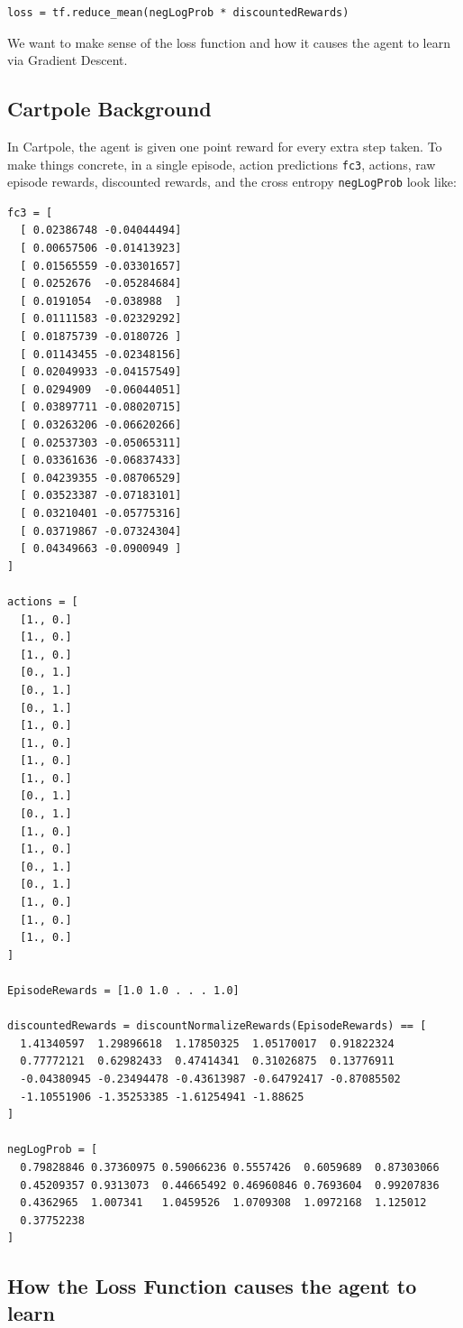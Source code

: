 \documentclass[20pt]{extarticle}
\theoremstyle{plain}
\theoremstyle{definition}
\theoremstyle{remark}
\newcommand{\0}{\varnothing}
\newcommand{\<}{\langle}
\renewcommand{\>}{\rangle}
\begin{document}
\footnotesize
\begin{lstlisting}
loss = tf.reduce_mean(negLogProb * discountedRewards)
\end{lstlisting}
\normalsize

We want to make sense of the loss function and how it causes the agent to learn via Gradient Descent.

\subsection{Cartpole Background}

In Cartpole, the agent is given one point reward for every extra step taken. To make things concrete, in a single episode, action predictions \lstinline{fc3}, actions, raw episode rewards, discounted rewards, and the cross entropy \lstinline{negLogProb} look like:

\scriptsize
\begin{lstlisting}
fc3 = [
  [ 0.02386748 -0.04044494]
  [ 0.00657506 -0.01413923]
  [ 0.01565559 -0.03301657]
  [ 0.0252676  -0.05284684]
  [ 0.0191054  -0.038988  ]
  [ 0.01111583 -0.02329292]
  [ 0.01875739 -0.0180726 ]
  [ 0.01143455 -0.02348156]
  [ 0.02049933 -0.04157549]
  [ 0.0294909  -0.06044051]
  [ 0.03897711 -0.08020715]
  [ 0.03263206 -0.06620266]
  [ 0.02537303 -0.05065311]
  [ 0.03361636 -0.06837433]
  [ 0.04239355 -0.08706529]
  [ 0.03523387 -0.07183101]
  [ 0.03210401 -0.05775316]
  [ 0.03719867 -0.07324304]
  [ 0.04349663 -0.0900949 ]
]

actions = [
  [1., 0.]
  [1., 0.]
  [1., 0.]
  [0., 1.]
  [0., 1.]
  [0., 1.]
  [1., 0.]
  [1., 0.]
  [1., 0.]
  [1., 0.]
  [0., 1.]
  [0., 1.]
  [1., 0.]
  [1., 0.]
  [0., 1.]
  [0., 1.]
  [1., 0.]
  [1., 0.]
  [1., 0.]
]

EpisodeRewards = [1.0 1.0 . . . 1.0]

discountedRewards = discountNormalizeRewards(EpisodeRewards) == [
  1.41340597  1.29896618  1.17850325  1.05170017  0.91822324
  0.77772121  0.62982433  0.47414341  0.31026875  0.13776911
  -0.04380945 -0.23494478 -0.43613987 -0.64792417 -0.87085502
  -1.10551906 -1.35253385 -1.61254941 -1.88625
]

negLogProb = [
  0.79828846 0.37360975 0.59066236 0.5557426  0.6059689  0.87303066
  0.45209357 0.9313073  0.44665492 0.46960846 0.7693604  0.99207836
  0.4362965  1.007341   1.0459526  1.0709308  1.0972168  1.125012
  0.37752238
]
\end{lstlisting}
\normalsize

\subsection{How the Loss Function causes the agent to learn}
\end{document}
